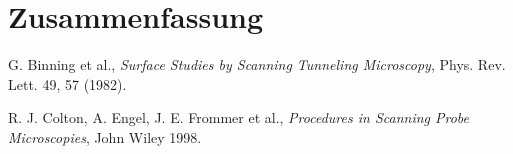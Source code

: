 \documentclass[10pt, a4paper]{article}
\begin{document}
\section{Zusammenfassung}


\begin{thebibliography}{9}

  G. Binning et al.,
  \emph{Surface Studies by Scanning Tunneling Microscopy},
  Phys. Rev. Lett. 49, 57 (1982).

  R. J. Colton, A. Engel, J. E. Frommer et al.,
  \emph{Procedures in Scanning Probe Microscopies},
  John Wiley 1998.
  
\end{thebibliography}
\end{document}
